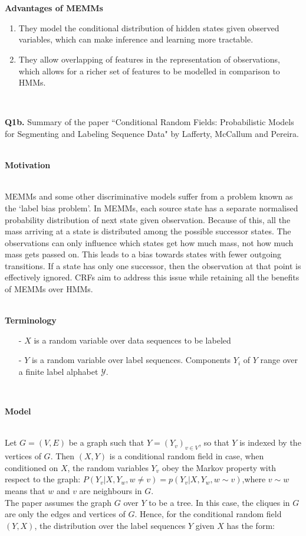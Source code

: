 \documentclass[]{article}
\begin{document}
\\ \\
\centerline{\bfseries Advantages of MEMMs} 
\begin{enumerate}[leftmargin=*]
\item They model the conditional distribution of hidden states given observed variables, which can make inference and learning more tractable.
\item They allow overlapping of features in the representation of observations, which allows for a richer set of features to be modelled in comparison to HMMs.
\end{enumerate} 
~\\
\par \noindent
{{\bfseries Q1b.}} Summary of the paper ``Conditional Random Fields: Probabilistic Models for Segmenting and Labeling Sequence Data" by Lafferty, McCallum and Pereira. \\ \\ 
\centerline{\bfseries Motivation} \\ MEMMs and some other discriminative models suffer from a problem known as the `label bias problem'. In MEMMs, each source state has a separate normalised probability distribution of next state given observation. Because of this, all the mass arriving at a state is distributed among the possible successor states. The observations can only influence which states get how much mass, not how much mass gets passed on. This leads to a bias towards states with fewer outgoing transitions. If a state has only one successor, then the observation at that point is effectively ignored. CRFs aim to address this issue while retaining all the benefits of MEMMs over HMMs. \\ \\ 
\centerline{\bfseries Terminology}
\begin{itemize}[leftmargin=*]
\item[-] $X$ is a random variable over data sequences to be labeled
\item[-] $Y$ is a random variable over label sequences. Components $Y_i$ of $Y$ range over a finite label alphabet $\mathcal{Y}$.
\end{itemize} 
~\\
\centerline{\bfseries Model} \\ Let $G = (V,E)$ be a graph such that $Y = (Y_v)_{v \in V}$, so that $Y$ is indexed by the vertices of $G$. Then $(X,Y)$ is a conditional random field in case, when conditioned on $X$, the random variables $Y_v$ obey the Markov property with respect to the graph: $P(Y_v |X,Y_w, w \ne v)=p(Y_v |X,Y_w, w \sim v)$,where $v \sim w$ means that $w$ and $v$ are neighbours in $G$. \vspace*{0.1cm}\\The paper assumes the graph $G$ over $Y$ to be a tree. In this case, the cliques in $G$ are only the edges and vertices of $G$. Hence, for the conditional random field $(Y,X)$, the distribution over the label sequences $Y$ given $X$ has the form:\\ \\
\end{document}
